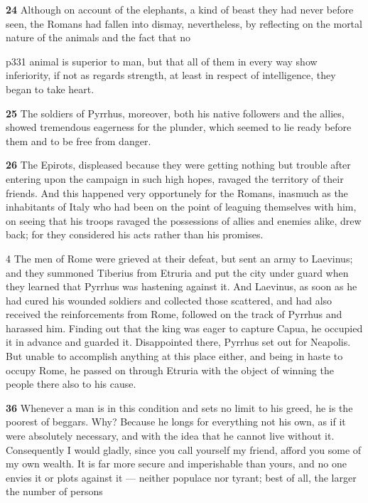 \textbf{24} Although on account of the elephants, a kind of beast they had never before seen, the Romans had fallen into dismay, nevertheless, by reflecting on the mortal nature of the animals and the fact that no

p331 animal is superior to man, but that all of them in every way show inferiority, if not as regards strength, at least in respect of intelligence, they began to take heart.

\textbf{25} The soldiers of Pyrrhus, moreover, both his native followers and the allies, showed tremendous eagerness for the plunder, which seemed to lie ready before them and to be free from danger.

\textbf{26} The Epirots, displeased because they were getting nothing but trouble after entering upon the campaign in such high hopes, ravaged the territory of their friends. And this happened very opportunely for the Romans, inasmuch as the inhabitants of Italy who had been on the point of leaguing themselves with him, on seeing that his troops ravaged the possessions of allies and enemies alike, drew back; for they considered his acts rather than his promises.

4
The men of Rome were grieved at their defeat, but sent an army to Laevinus; and they summoned Tiberius from Etruria and put the city under guard when they learned that Pyrrhus was hastening against it. And Laevinus, as soon as he had cured his wounded soldiers and collected those scattered, and had also received the reinforcements from Rome, followed on the track of Pyrrhus and harassed him. Finding out that the king was eager to capture Capua, he occupied it in advance and guarded it. Disappointed there, Pyrrhus set out for Neapolis. But unable to accomplish anything at this place either, and being in haste to occupy Rome, he passed on through Etruria with the object of winning the people there also to his cause.

\textbf{36} Whenever a man is in this condition and sets no limit to his greed, he is the poorest of beggars. Why? Because he longs for everything not his own, as if it were absolutely necessary, and with the idea that he cannot live without it. Consequently I would gladly, since you call yourself my friend, afford you some of my own wealth. It is far more secure and imperishable than yours, and no one envies it or plots against it \texthebrew{—} neither populace nor tyrant; best of all, the larger the number of persons

